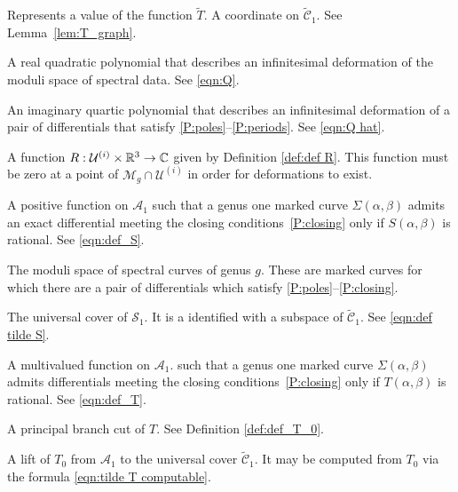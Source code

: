\begin{description}[align=right]
\item[$\mathcal{P}^k_\R$]

\item[$q$] Represents a value of the function $\tilde{T}$. A coordinate on $\mathcal{\tilde{C}}_1$. See Lemma~\ref{lem:T_graph}.

\item[$Q$] A real quadratic polynomial that describes an infinitesimal deformation of the moduli space of spectral data. See \eqref{eqn:Q}.

\item[$\hat{Q}$] An imaginary quartic polynomial that describes an infinitesimal deformation of a pair of differentials that satisfy \ref{P:poles}--\ref{P:periods}. See \eqref{eqn:Q hat}.

\item[$R$] A function $R : \mathcal{U}^{(i)} \times \R^3 \to \C$ given by Definition \ref{def:def R}. This function must be zero at a point of $\mathcal{M}_g \cap \mathcal{U}^{(i)}$ in order for deformations to exist.

\item[$S$] A positive function on $\mathcal{A}_1$ such that a genus one marked curve $Σ(α,β)$ admits an exact differential meeting the closing conditions~\ref{P:closing} only if $S(α,β)$ is rational. See \eqref{eqn:def_S}.

\item[$\mathcal{S}_g$] The moduli space of spectral curves of genus $g$. These are marked curves for which there are a pair of differentials which satisfy \ref{P:poles}--\ref{P:closing}.

\item[$\mathcal{\tilde{S}}_1$] The universal cover of $\mathcal{S}_1$. It is a identified with a subspace of $\mathcal{\tilde{C}}_1$. See \eqref{eqn:def tilde S}.

\item[$T$] A multivalued function on $\mathcal{A}_1$. such that a genus one marked curve $Σ(α,β)$ admits differentials meeting the closing conditions~\ref{P:closing} only if $T(α,β)$ is rational. See \eqref{eqn:def_T}.

\item[$T_0$] A principal branch cut of $T$. See Definition \ref{def:def_T_0}.

\item[$\tilde{T}$] A lift of $T_0$ from $\mathcal{A}_1$ to the universal cover $\mathcal{\tilde{C}}_1$. It may be computed from $T_0$ via the formula \eqref{eqn:tilde T computable}.


\end{description}
